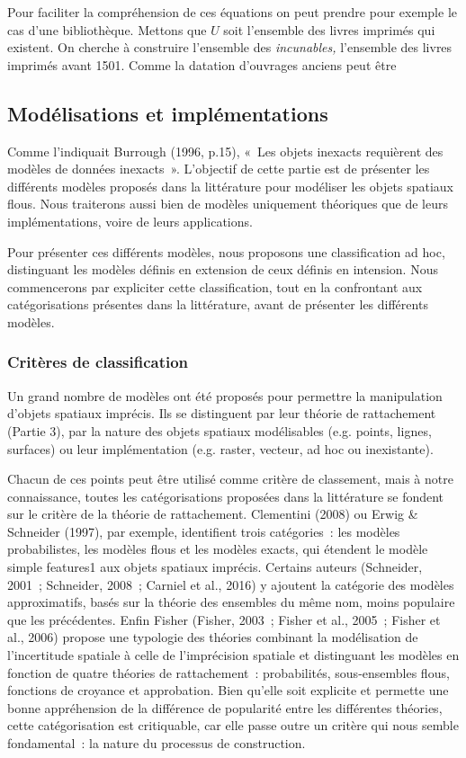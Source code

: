 Pour faciliter la compréhension de ces équations on peut prendre pour
exemple le cas d'une bibliothèque. Mettons que $U$ soit l'ensemble des
livres imprimés qui existent. On cherche à construire l'ensemble des
\emph{incunables,} \ie l'ensemble des livres imprimés avant
1501. Comme la datation d'ouvrages anciens peut être 


\subsection{Modélisations et implémentations}


Comme l’indiquait Burrough (1996, p.15), « Les objets inexacts
requièrent des modèles de données inexacts ». L’objectif de cette
partie est de présenter les différents modèles proposés dans la
littérature pour modéliser les objets spatiaux flous. Nous
traiterons aussi bien de modèles uniquement théoriques que de leurs
implémentations, voire de leurs applications.

Pour présenter ces différents modèles, nous proposons une
classification ad hoc, distinguant les modèles définis en extension
de ceux définis en intension. Nous commencerons par expliciter cette
classification, tout en la confrontant aux catégorisations présentes
dans la littérature, avant de présenter les différents modèles.

\subsubsection{Critères de classification}

Un grand nombre de modèles ont été proposés pour permettre la
manipulation d’objets spatiaux imprécis. Ils se distinguent par leur
théorie de rattachement (Partie 3), par la nature des objets spatiaux
modélisables (e.g. points, lignes, surfaces) ou leur implémentation
(e.g. raster, vecteur, ad hoc ou inexistante).

Chacun de ces points peut être utilisé comme critère de classement,
mais à notre connaissance, toutes les catégorisations proposées dans
la littérature se fondent sur le critère de la théorie de
rattachement. Clementini (2008) ou Erwig \& Schneider (1997), par
exemple, identifient trois catégories : les modèles probabilistes, les
modèles flous et les modèles exacts, qui étendent le modèle simple
features1 aux objets spatiaux imprécis. Certains auteurs (Schneider,
2001 ; Schneider, 2008 ; Carniel et al., 2016) y ajoutent la catégorie
des modèles approximatifs, basés sur la théorie des ensembles du même
nom, moins populaire que les précédentes. Enfin Fisher (Fisher, 2003 ;
Fisher et al., 2005 ; Fisher et al., 2006) propose une typologie des
théories combinant la modélisation de l’incertitude spatiale à celle
de l’imprécision spatiale et distinguant les modèles en fonction de
quatre théories de rattachement : probabilités, sous-ensembles flous,
fonctions de croyance et approbation. Bien qu’elle soit explicite et
permette une bonne appréhension de la différence de popularité entre
les différentes théories, cette catégorisation est critiquable, car
elle passe outre un critère qui nous semble fondamental : la nature du
processus de construction.

